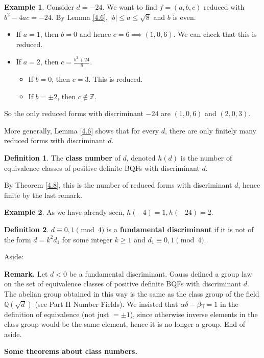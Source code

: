 \documentclass{article}
\theoremstyle{definition}
\newtheorem{example}{Example}[section]
\newtheorem{defn}{Definition}[section]
\begin{document}
\begin{example}
    Consider $d = -24$. We want to find $f = (a,b,c)$ reduced with $b^2-4ac=-24$. By Lemma \ref{4.6}, $|b|\le a \le \sqrt{8}$ and $b$ is even.
    \begin{itemize}
        \item If $a=1$, then $b=0$ and hence $c=6 \implies (1,0,6)$. We can check that this is reduced.
        \item If $a=2$, then $c=\frac{b^2+24}{8}$.
        \begin{itemize}
            \item If $b=0$, then $c=3$. This is reduced.
            \item If $b=\pm 2$, then $c \not\in \mathbb{Z}$.
        \end{itemize}
    \end{itemize}
    So the only reduced forms with discriminant $-24$ are $(1,0,6)$ and $(2,0,3)$.
\end{example}
More generally, Lemma \ref{4.6} shows that for every $d$, there are only finitely many reduced forms with discriminant $d$.
\begin{defn}
    The \textbf{class number} of $d$, denoted $h(d)$ is the number of equivalence classes of positive definite BQFs with discriminant $d$.
\end{defn}
By Theorem \ref{4.8}, this is the number of reduced forms with discriminant $d$, hence finite by the last remark.
\begin{example}
    As we have already seen, $h(-4)=1, h(-24)=2$.
\end{example}
\begin{defn}
    $d \equiv 0,1 \pmod{4}$ is a \textbf{fundamental discriminant} if it is not of the form $d=k^2d_1$ for some integer $k\ge 1$ and $d_1 \equiv 0,1 \pmod{4}$.
\end{defn}

Aside:

\textbf{Remark.} Let $d<0$ be a fundamental discriminant. Gauss defined a group law on the set of equivalence classes of positive definite BQFs with discriminant $d$. The abelian group obtained in this way is the same as the class group of the field $\mathbb{Q}(\sqrt{d})$ (see Part II Number Fields). We insisted that $\alpha \delta - \beta \gamma = 1$ in the definition of equivalence (not just $=\pm 1$), since otherwise inverse elements in the class group would be the same element, hence it is no longer a group. End of aside.

\textbf{Some theorems about class numbers.}
\end{document}
